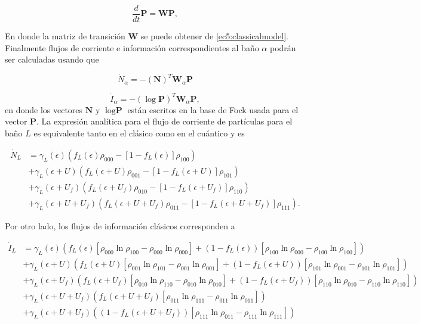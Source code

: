 \begin{equation*}
    \frac{d}{dt}\textbf{P} = \textbf{W}\textbf{P},
\end{equation*}

En donde la matriz de transición $\textbf{W}$ se puede obtener de \ref{ec5:classicalmodel}. Finalmente flujos de corriente e información correspondientes al baño $\alpha$ podrán ser calculadas usando que 

\begin{equation*}
    \dot{N}_{\alpha} = -(\textbf{N})^{T} \textbf{W}_{\alpha}\textbf{P}
\end{equation*}

\begin{equation*}
    \dot{I}_{\alpha} = -(\log \textbf{P})^{T} \textbf{W}_{\alpha}\textbf{P},
\end{equation*}
en donde los vectores $\textbf{N}$ y $\log \textbf{P}$ están escritos en la base de Fock usada para el vector $\textbf{P}$. La expresión analítica para el flujo de corriente de partículas para el baño $L$ es equivalente tanto en el clásico como en el cuántico y es 

\begin{align*}
    \dot{N}_{L} & = \gamma_{L}(\epsilon)(f_{L}(\epsilon)\rho_{000} - [1-f_{L}(\epsilon)]\rho_{100} ) \\
        & + \gamma_{L}(\epsilon + U) (f_{L}(\epsilon+U)\rho_{001} - [1-f_{L}(\epsilon+U)]\rho_{101} )  \\
        & + \gamma_{L}(\epsilon + U_{f}) (f_{L}(\epsilon+U_{f})\rho_{010} - [1-f_{L}(\epsilon+U_{f})]\rho_{110} )  \\  
        & + \gamma_{L}(\epsilon + U + U_{f}) (f_{L}(\epsilon+U + U_{f})\rho_{011} - [1-f_{L}(\epsilon+U+U_{f})]\rho_{111} ).
\end{align*}

Por otro lado, los flujos de información clásicos corresponden a 

\begin{align*}
  \dot{I}_{L}  &  =  \gamma_{L}(\epsilon)(f_{L}(\epsilon)[\rho_{000}\ln \rho_{100} - \rho_{000}\ln \rho_{000}] + (1-f_{L}(\epsilon))[\rho_{100}\ln \rho_{000} - \rho_{100}\ln \rho_{100} ] )  \\ 
      & + \gamma_{L}(\epsilon + U)(f_{L}(\epsilon + U)[\rho_{001}\ln \rho_{101} - \rho_{001}\ln \rho_{001}] + (1-f_{L}(\epsilon + U))[\rho_{101}\ln \rho_{001} -\rho_{101}\ln \rho_{101} ]   ) \\  
      & + \gamma_{L}(\epsilon + U_{f})( f_{L}(\epsilon + U_{f})[\rho_{010}\ln \rho_{110} -\rho_{010}\ln \rho_{010} ]  + (1-f_{L}(\epsilon + U_{f}))[\rho_{110}\ln \rho_{010} - \rho_{110}\ln \rho_{110} ] ) \\  
      & + \gamma_{L}(\epsilon + U + U_{f})( f_{L}(\epsilon + U + U_{f})[\rho_{011}\ln \rho_{111}- \rho_{011}\ln \rho_{011}]) \\   
      & + \gamma_{L}(\epsilon + U + U_{f})( (1-f_{L}(\epsilon+U+U_{f}) )[\rho_{111}\ln \rho_{011} - \rho_{111}\ln \rho_{111}])   
\end{align*}

